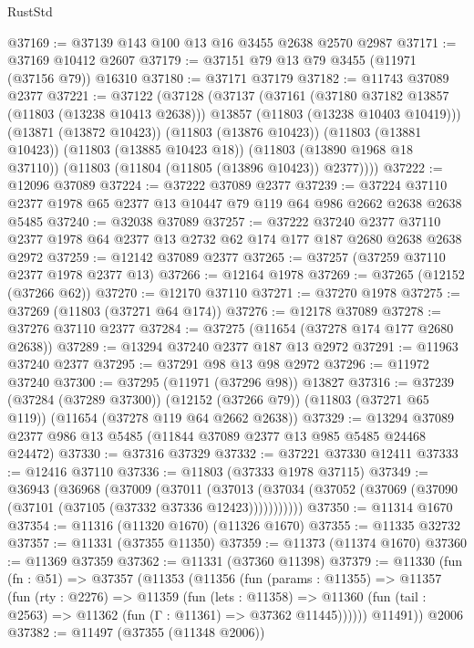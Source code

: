 \begin{lexlean}{RustStd}
\begin{coremodule}
@37169 := @37139 @143 @100 @13 @16 @3455 @2638 @2570 @2987
@37171 := @37169 @10412 @2607
@37179 := @37151 @79 @13 @79 @3455 (@11971 (@37156 @79)) @16310
@37180 := @37171 @37179
@37182 := @11743 @37089 @2377
@37221 := @37122
    (@37128
      (@37137
        (@37161
          (@37180 @37182 @13857 (@11803 (@13238 @10413 @2638)))
          @13857
          (@11803 (@13238 @10403 @10419)))
        (@13871 (@13872 @10423))
        (@11803 (@13876 @10423))
        (@11803 (@13881 @10423))
        (@11803 (@13885 @10423 @18))
        (@11803 (@13890 @1968 @18 @37110))
        (@11803 (@11804 (@11805 (@13896 @10423)) @2377))))
@37222 := @12096 @37089
@37224 := @37222 @37089 @2377
@37239 := @37224 @37110 @2377 @1978 @65 @2377 @13 @10447 @79 @119 @64 @986 @2662 @2638 @2638 @5485
@37240 := @32038 @37089
@37257 := @37222
    @37240
    @2377
    @37110
    @2377
    @1978
    @64
    @2377
    @13
    @2732
    @62
    @174
    @177
    @187
    @2680
    @2638
    @2638
    @2972
@37259 := @12142 @37089 @2377
@37265 := @37257 (@37259 @37110 @2377 @1978 @2377 @13)
@37266 := @12164 @1978
@37269 := @37265 (@12152 (@37266 @62))
@37270 := @12170 @37110
@37271 := @37270 @1978
@37275 := @37269 (@11803 (@37271 @64 @174))
@37276 := @12178 @37089
@37278 := @37276 @37110 @2377
@37284 := @37275 (@11654 (@37278 @174 @177 @2680 @2638))
@37289 := @13294 @37240 @2377 @187 @13 @2972
@37291 := @11963 @37240 @2377
@37295 := @37291 @98 @13 @98 @2972
@37296 := @11972 @37240
@37300 := @37295 (@11971 (@37296 @98)) @13827
@37316 := @37239
    (@37284 (@37289 @37300))
    (@12152 (@37266 @79))
    (@11803 (@37271 @65 @119))
    (@11654 (@37278 @119 @64 @2662 @2638))
@37329 := @13294 @37089 @2377 @986 @13 @5485 (@11844 @37089 @2377 @13 @985 @5485 @24468 @24472)
@37330 := @37316 @37329
@37332 := @37221 @37330 @12411
@37333 := @12416 @37110
@37336 := @11803 (@37333 @1978 @37115)
@37349 := @36943
    (@36968
      (@37009
        (@37011
          (@37013 (@37034 (@37052 (@37069 (@37090 (@37101 (@37105 (@37332 @37336 @12423)))))))))))
@37350 := @11314 @1670
@37354 := @11316 (@11320 @1670) (@11326 @1670)
@37355 := @11335 @32732
@37357 := @11331 (@37355 @11350)
@37359 := @11373 (@11374 @1670)
@37360 := @11369 @37359
@37362 := @11331 (@37360 @11398)
@37379 := @11330
    (fun (fn : @51) =>
    @37357
      (@11353
        (@11356
          (fun (params : @11355) =>
          @11357
            (fun (rty : @2276) =>
            @11359
              (fun (lets : @11358) =>
              @11360 (fun (tail : @2563) => @11362 (fun (Γ : @11361) => @37362 @11445))))))
        @11491))
    @2006
@37382 := @11497 (@37355 (@11348 @2006))

\end{coremodule}
\end{lexlean}
